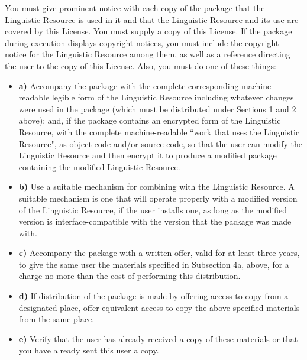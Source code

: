 \documentclass[10pt]{article}
\begin{document}
\vspace{5pt}\noindent
You must 
      give prominent notice with each copy of the package that the Linguistic 
      Resource is used in it and that the Linguistic Resource and its use are 
      covered by this License. You must supply a copy of this License. If the 
      package during execution displays copyright notices, you must include the 
      copyright notice for the Linguistic Resource among them, as well as a 
      reference directing the user to the copy of this License. Also, you must 
      do one of these things: 
\begin{itemize}
\item {\bf a)} Accompany the package 
        with the complete corresponding machine-readable legible form of the 
        Linguistic Resource including whatever changes were used in the package 
        (which must be distributed under Sections 1 and 2 above); and, if the 
        package contains an encrypted form of the Linguistic Resource, with the 
        complete machine-readable ``work that uses the Linguistic Resource", as 
        object code and/or source code, so that the user can modify the 
        Linguistic Resource and then encrypt it to produce a modified package 
        containing the modified Linguistic Resource. 
\item {\bf b)} Use a suitable mechanism 
        for combining with the Linguistic Resource. A suitable mechanism is one 
        that will operate properly with a modified version of the Linguistic 
        Resource, if the user installs one, as long as the modified version is 
        interface-compatible with the version that the package was made with. 
\item {\bf c)} Accompany the package 
        with a written offer, valid for at least three years, to give the same 
        user the materials specified in Subsection 4a, above, for a charge no 
        more than the cost of performing this distribution. 

\item {\bf d)} If distribution of the 
        package is made by offering access to copy from a designated place, 
        offer equivalent access to copy the above specified materials from the 
        same place. 
\item {\bf e)} Verify that the user has 
        already received a copy of these materials or that you have already sent 
        this user a copy. 

\end{itemize}
\end{document}
